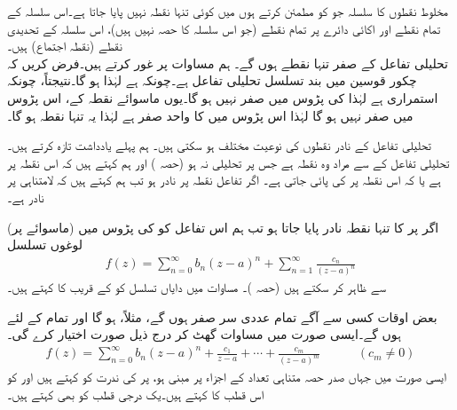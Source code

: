 مخلوط نقطوں  کا سلسلہ جو  کو مطمئن کرتے ہوں میں کوئی تنہا نقطہ نہیں پایا جاتا ہے۔اس سلسلہ کے تمام نقطے اور اکائی دائرے پر تمام نقطے (جو اس سلسلہ کا حصہ نہیں ہیں)، اس سلسلہ کے تحدیدی نقطے (نقطہ اجتماع) ہیں۔ 
\quad {}\\
تحلیلی تفاعل  کے صفر تنہا نقطے ہوں گے۔
\quad
ہم مساوات  پر غور کرتے ہیں۔فرض کریں کہ چکور قوسین میں بند تسلسل  تحلیلی تفاعل  ہے۔چونکہ  ہے لہٰذا  ہو گا۔نتیجتاً، چونکہ  استمراری ہے لہٰذا  کی پڑوس میں  صفر نہیں ہو گا۔یوں ماسوائے نقطہ  کے،   اس پڑوس میں صفر نہیں ہو گا لہٰذا اس پڑوس میں  کا واحد صفر ہے  لہٰذا یہ تنہا نقطہ ہو گا۔

تحلیلی تفاعل کے نادر نقطوں کی نوعیت مختلف ہو سکتی ہیں۔ ہم پہلے یادداشت تازہ کرتے ہیں۔ تحلیلی تفاعل  کے  سے مراد وہ نقطہ ہے جس پر  تحلیلی نہ ہو (حصہ ) اور ہم کہتے ہیں کہ اس نقطہ پر   ہے یا کہ اس نقطہ پر  کی  پائی جاتی ہے۔ اگر تفاعل  نقطہ  پر نادر ہو تب ہم کہتے ہیں کہ  لامتناہی پر نادر ہے۔

اگر  پر  کا تنہا نقطہ نادر پایا جاتا ہو تب ہم اس تفاعل کو  کی پڑوس میں (ماسوائے  پر) لوغوں تسلسل
\begin{align}\label{مساوات_ٹیلر_لوغوں_تنہا_نقطہ_نادر_الف}
f(z)=\sum\limits_{n=0}^{\infty} b_n(z-a)^n+\sum\limits_{n=1}^{\infty} \frac{c_n}{(z-a)^n}
\end{align}
سے ظاہر کر سکتے ہیں (حصہ )۔ مساوات  میں دایاں تسلسل کو  کے قریب  کا  کہتے ہیں۔

بعض اوقات کسی  سے آگے تمام عددی سر  صفر ہوں گے، مثلاً،  ہو گا اور تمام  کے لئے  ہوں گے۔ایسی صورت میں مساوات  گھٹ کر درج ذیل صورت اختیار کرے گی۔
\begin{align}\label{مساوات_ٹیلر_لوغوں_تنہا_نقطہ_نادر_ب}
f(z)=\sum\limits_{n=0}^{\infty} b_n(z-a)^n+\frac{c_1}{z-a}+\cdots+\frac{c_m}{(z-a)^m}\quad \quad\quad (c_m\ne 0)
\end{align}  
ایسی صورت میں جہاں صدر حصہ متناہی تعداد کے اجزاء پر مبنی ہو،  پر  کی ندرت کو  کہتے ہیں اور  کو اس قطب کا  کہتے ہیں۔یک درجی قطب کو  بھی کہتے ہیں۔

